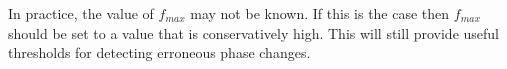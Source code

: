 \documentclass[11pt,draftcls,onecolumn]{IEEEtran}
\begin{document}
In practice, the value of $f_{max}$ may not be known. If this is the case then $f_{max}$ should be set to a value that is conservatively high. This will still provide useful thresholds for detecting erroneous phase changes.
% 
\end{document}
